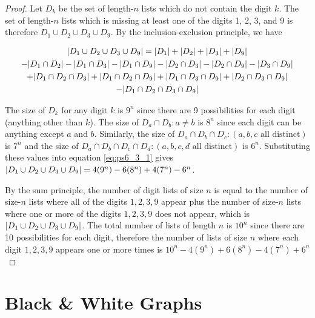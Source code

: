 \documentclass[12pt]{article}
\begin{document}
\begin{proof}
Let $D_k$ be the set of length-$n$ lists which do not contain the digit $k$. The set of length-$n$ lists which is missing at least one of the digits 1, 2, 3, and 9 is therefore $D_1 \cup D_2 \cup D_3 \cup D_9$. By the inclusion-exclusion principle, we have

\begin{multline}\label{eq:ps6_3_1}
    |D_{1} \cup D_{2} \cup D_{3} \cup D_{9}| = |D_{1}| + |D_{2}| + |D_{3}| + |D_{9}|\\ 
    -|D_{1} \cap D_{2}| - |D_{1} \cap D_{3}| - |D_{1} \cap D_{9}| - |D_{2} \cap D_{3}| - |D_{2} \cap D_{9}| - |D_{3} \cap D_{9}|\\
    +|D_{1} \cap D_{2} \cap D_{3}| + |D_{1} \cap D_{2} \cap D_{9}| + |D_{1} \cap D_{3} \cap D_{9}| + |D_{2} \cap D_{3} \cap D_{9}|\\
    -|D_{1} \cap D_{2} \cap D_{3} \cap D_{9}|
\end{multline}

The size of $D_k$ for any digit $k$ is $9^n$ since there are 9 possibilities for each digit (anything other than $k$). The size of $D_a \cap D_b : a \neq b$ is $8^n$ since each digit can be anything except $a$ and $b$. Similarly, the size of $D_a \cap D_b \cap D_c: (a,b,c \text{ all distinct})$ is $7^n$ and the size of $D_a \cap D_b \cap D_c \cap D_d: (a,b,c,d \text{ all distinct})$ is $6^n$. Substituting these values into equation \ref{eq:ps6_3_1} gives $
    |D_{1} \cup D_{2} \cup D_{3} \cup D_{9}| = 4(9^n) - 6(8^n) + 4(7^n) - 6^n$.
     
By the sum principle, the number of digit lists of size $n$ is equal to the number of size-$n$ lists where all of the digits $1,2,3,9$ appear plus the number of size-$n$ lists where one or more of the digits $1,2,3,9$ does not appear, which is $|D_{1} \cup D_{2} \cup D_{3} \cup D_{9}|$. The total number of lists of length $n$ is $10^n$ since there are 10 possibilities for each digit, therefore the number of lists of size $n$ where each digit $1,2,3,9$ appears one or more times is $10^n - 4(9^n) + 6(8^n) - 4(7^n) + 6^n$
\end{proof}

\section{Black \& White Graphs}
\end{document}

